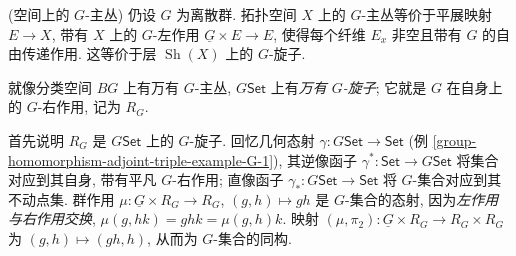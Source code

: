 \begin{example}
	{(空间上的 $G$-主丛)}
	仍设 $G$ 为离散群. 拓扑空间 $X$ 上的 $G$-主丛等价于平展映射 $E \to X$, 带有 $X$ 上的 $G$-左作用 $\underline G\times E \to E$, 使得每个纤维 $E_x$ 非空且带有 $G$ 的自由传递作用. 这等价于层\topos{} $\operatorname{Sh}(X)$ 上的 $G$-旋子.
\end{example}

就像分类空间 $BG$ 上有万有 $G$-主丛, \topos{} $G\mathsf {Set}$ 上有\emph{万有 $G$-旋子}; 它就是 $G$ 在自身上的 $G$-右作用, 记为 $R_G$.

首先说明 $R_G$ 是 $G\mathsf {Set}$ 上的 $G$-旋子.
回忆几何态射 $\gamma\colon G\mathsf {Set} \to \mathsf {Set}$ (例 \ref{group-homomorphism-adjoint-triple-example-G-1}), 其逆像函子 $\gamma^*\colon \mathsf {Set} \to G\mathsf {Set}$ 将集合对应到其自身, 带有平凡 $G$-右作用; 直像函子 $\gamma_*\colon G\mathsf {Set}\to\mathsf {Set}$ 将 $G$-集合对应到其不动点集.
群作用 $\mu\colon \underline G\times R_G \to R_G$, $(g,h)\mapsto gh$ 是 $G$-集合的态射, 因为\emph{左作用与右作用交换},  $\mu(g,hk)=ghk=\mu(g,h)k$.
映射 $(\mu,\pi_2)\colon \underline G\times R_G\to R_G\times R_G$ 为 $(g,h)\mapsto (gh,h)$, 从而为 $G$-集合的同构.

